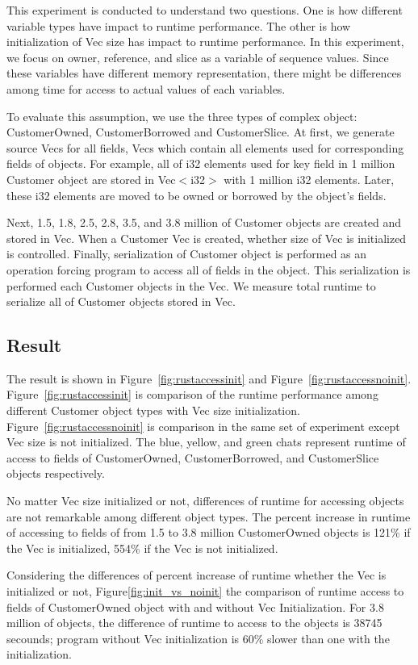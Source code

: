 This experiment is conducted to understand two questions. One is how different variable types have impact to runtime performance.
The other is how initialization of Vec size has impact to runtime performance. 
In this experiment, we focus on owner, reference, and slice as a variable of sequence values. 
Since these variables have different memory representation, there might be differences among time for access to actual values of each variables.

To evaluate this assumption, we use the three types of complex object: CustomerOwned, CustomerBorrowed and CustomerSlice. 
At first, we generate source Vecs for all fields, Vecs which contain all elements used for corresponding fields of objects.
For example, all of i32 elements used for key field in 1 million Customer object are stored in Vec$<$i32$>$ with 1 million i32 elements. 
Later, these i32 elements are moved to be owned or borrowed by the object's fields.

Next, 1.5, 1.8, 2.5, 2.8, 3.5, and 3.8 million of Customer objects are created and stored in Vec. 
When a Customer Vec is created, whether size of Vec is initialized is controlled. 
Finally, serialization of Customer object is performed as an operation forcing program to access all of fields in the object.
This serialization is performed each Customer objects in the Vec. We measure total runtime to serialize all of Customer objects 
stored in Vec. 

\subsection{Result}
\label{sec:history}
The result is shown in Figure~\ref{fig:rustaccessinit} and Figure~\ref{fig:rustaccessnoinit}.
Figure~\ref{fig:rustaccessinit} is comparison of the runtime performance among different Customer object types with Vec size initialization.
Figure~\ref{fig:rustaccessnoinit} is comparison in the same set of experiment except Vec size is not initialized. 
The blue, yellow, and green chats represent runtime of access to fields of CustomerOwned, CustomerBorrowed, and CustomerSlice objects respectively.

No matter Vec size initialized or not, differences of runtime for accessing objects are not remarkable among different object types. 
The percent increase in runtime of accessing to fields of from 1.5 to 3.8 million CustomerOwned objects is 121\% if the Vec is initialized, 554\% if the Vec is not initialized.

Considering the differences of percent increase of runtime whether the Vec is initialized or not, 
Figure\ref{fig:init_vs_noinit} the comparison of runtime access to fields of CustomerOwned object with and without Vec Initialization.
For 3.8 million of objects, the difference of runtime to access to the objects is 38745 secounds; program without Vec initialization is 60\% slower than one with the initialization.

